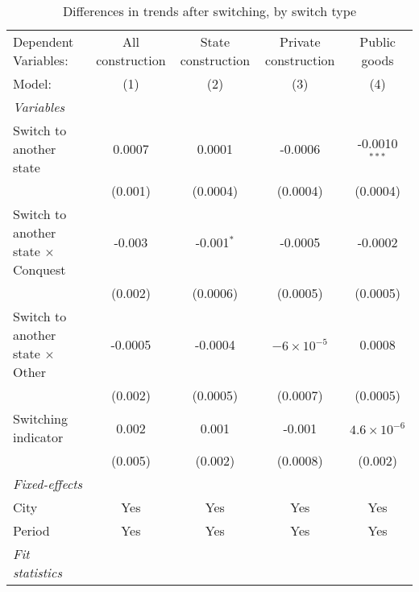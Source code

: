 \begin{table}[htbp]
   \caption{\label{tab:baseline_1y} Differences in trends after switching, by switch type}
   \centering
   \begin{tabular}{lcccc}
      \tabularnewline \midrule \midrule
      Dependent Variables:                       & All construction      & State construction    & Private construction  & Public goods\\  
      Model:                                     & (1)                   & (2)                   & (3)                   & (4)\\  
      \midrule
      \emph{Variables}\\
      Switch to another state                    & 0.0007                & 0.0001                & -0.0006               & -0.0010$^{***}$\\   
                                                 & (0.001)               & (0.0004)              & (0.0004)              & (0.0004)\\   
      Switch to another state $\times$ Conquest  & -0.003                & -0.001$^{*}$          & -0.0005               & -0.0002\\   
                                                 & (0.002)               & (0.0006)              & (0.0005)              & (0.0005)\\   
      Switch to another state $\times$ Other     & -0.0005               & -0.0004               & $-6\times 10^{-5}$    & 0.0008\\   
                                                 & (0.002)               & (0.0005)              & (0.0007)              & (0.0005)\\   
      Switching indicator                        & 0.002                 & 0.001                 & -0.001                & $4.6\times 10^{-6}$\\    
                                                 & (0.005)               & (0.002)               & (0.0008)              & (0.002)\\   
      \midrule
      \emph{Fixed-effects}\\
      City                                       & Yes                   & Yes                   & Yes                   & Yes\\  
      Period                                     & Yes                   & Yes                   & Yes                   & Yes\\  
      \midrule
      \emph{Fit statistics}\\

\end{tabular}
\end{table}
